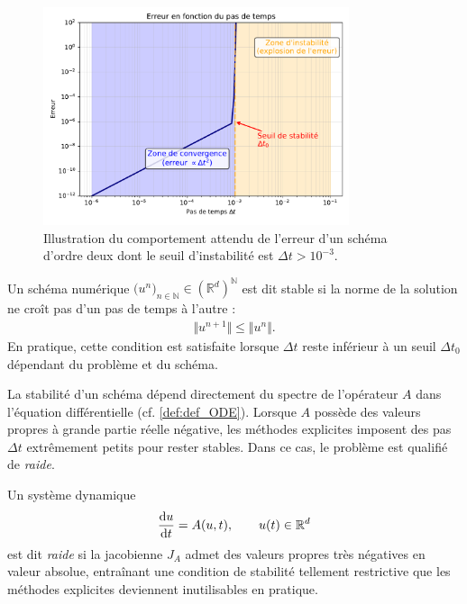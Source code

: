 \begin{figure}[htbp]
    \centering
    \includegraphics[width=0.8\textwidth]{media/3_/2_/exemple_satabilite.pdf}
    \caption{Illustration du comportement attendu de l'erreur d'un schéma d'ordre deux dont le seuil d'instabilité est $\Delta t > 10^{-3}$.}
    \label{fig:stabilite_schema}
\end{figure}

\begin{definition}
Un schéma numérique $\bigl(u^n\bigr)_{n\in\mathbb{N}} \in (\mathbb{R}^d)^{\mathbb{N}}$ est dit stable si la norme de la solution ne croît pas d'un pas de temps à l'autre :
\begin{align}
    \Vert u^{n+1} \Vert \leq \Vert u^n \Vert.
\end{align}
En pratique, cette condition est satisfaite lorsque $\Delta t$ reste inférieur à un seuil $\Delta t_0$ dépendant du problème et du schéma.
\end{definition}

La stabilité d'un schéma dépend directement du spectre de l'opérateur $A$ dans l'équation différentielle (cf. \eqref{def:def_ODE}).  
Lorsque $A$ possède des valeurs propres à grande partie réelle négative, les méthodes explicites imposent des pas $\Delta t$ extrêmement petits pour rester stables.  
Dans ce cas, le problème est qualifié de \emph{raide}.

\begin{definition}
Un système dynamique
\begin{align}
    \frac{\text d u}{\text d t} = A(u,t), \qquad u(t)\in\mathbb{R}^d
\end{align}
est dit \emph{raide} si la jacobienne $J_A$ admet des valeurs propres très négatives en valeur absolue, entraînant une condition de stabilité tellement restrictive que les méthodes explicites deviennent inutilisables en pratique.
\end{definition}


